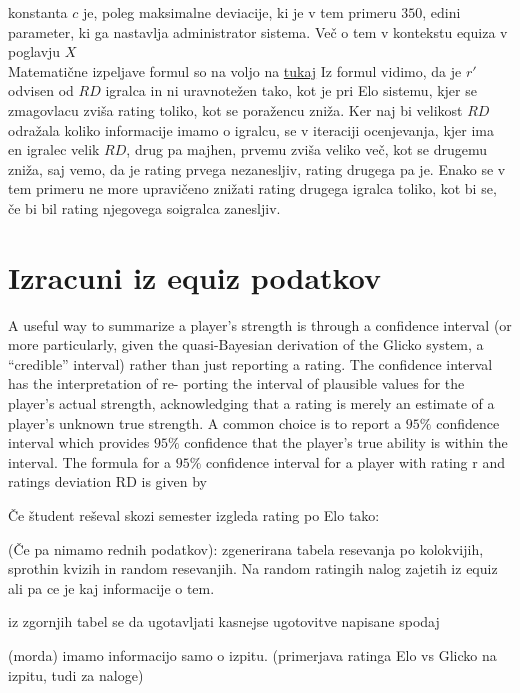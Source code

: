 \documentclass{IEEEtran}
\begin{document}
konstanta $c$ je, poleg maksimalne deviacije, ki je v tem primeru $350$, edini parameter, ki ga nastavlja administrator sistema. Več o tem v kontekstu equiza v poglavju $X$ %
\hfill
\\
Matematične izpeljave formul so na voljo na \href{http://www.glicko.net/research/glicko.pdf}{tukaj} %
\newpage
Iz formul vidimo, da je $r'$ odvisen od $RD$ igralca in ni uravnotežen tako, kot je pri Elo sistemu, kjer se zmagovlacu zviša rating toliko, kot se poražencu zniža. Ker naj bi velikost $RD$ odražala koliko informacije imamo o igralcu, se v iteraciji ocenjevanja, kjer ima en igralec velik $RD$, drug pa majhen, prvemu zviša veliko več, kot se drugemu zniža, saj vemo, da je rating prvega nezanesljiv, rating drugega pa je. Enako se v tem primeru ne more upravičeno znižati rating drugega igralca toliko, kot bi se, če bi bil rating njegovega soigralca zanesljiv.

\hfill

\section{Izracuni iz equiz podatkov}
\label{sec:equiz}
A useful way to summarize a player’s strength is through a confidence interval (or more particularly, given the quasi-Bayesian derivation of the Glicko system, a “credible” interval) rather than just reporting a rating. The confidence interval has the interpretation of re- porting the interval of plausible values for the player’s actual strength, acknowledging that a rating is merely an estimate of a player’s unknown true strength. A common choice is to report a $95\%$ confidence interval which provides $95\%$ confidence that the player’s true ability is within the interval. The formula for a $95\%$ confidence interval for a player with rating r and ratings deviation RD is given by
%

Če študent reševal skozi semester izgleda rating po Elo tako: 

(Če pa nimamo rednih podatkov):
zgenerirana tabela resevanja po kolokvijih, sprothin kvizih in random resevanjih. Na random ratingih nalog zajetih iz equiz ali
pa ce je kaj informacije o tem.

iz zgornjih tabel se da ugotavljati kasnejse ugotovitve napisane spodaj

(morda) imamo informacijo samo o izpitu.
(primerjava ratinga Elo vs Glicko na izpitu, tudi za naloge)
\end{document}
